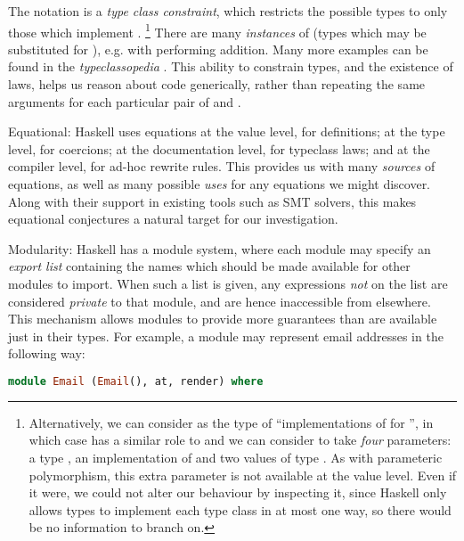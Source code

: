 \begin{description}
The notation  is a \emph{type class constraint}, which restricts the possible types  to only those which implement . \footnote{Alternatively, we can consider  as the type of ``implementations of  for '', in which case \hs{=>} has a similar role to \hs{->} and we can consider  to take \emph{four} parameters: a type , an implementation of  and two values of type . As with parameteric polymorphism, this extra  parameter is not available at the value level. Even if it were, we could not alter our behaviour by inspecting it, since Haskell only allows types to implement each type class in at most one way, so there would be no information to branch on.} There are many \emph{instances} of  (types which may be substituted for ), e.g.  with  performing addition. Many more examples can be found in the \emph{typeclassopedia} \citep{yorgey2009typeclassopedia}. This ability to constrain types, and the existence of laws, helps us reason about code generically, rather than repeating the same arguments for each particular pair of  and .

\item{Equational}: Haskell uses equations at the value level, for definitions; at the type level, for coercions; at the documentation level, for typeclass laws; and at the compiler level, for ad-hoc rewrite rules. This provides us with many \emph{sources} of equations, as well as many possible \emph{uses} for any equations we might discover. Along with their support in existing tools such as SMT solvers, this makes equational conjectures a natural target for our investigation.

\item{Modularity}: Haskell has a module system, where each module may specify an \emph{export list} containing the names which should be made available for other modules to import. When such a list is given, any expressions \emph{not} on the list are considered \emph{private} to that module, and are hence inaccessible from elsewhere. This mechanism allows modules to provide more guarantees than are available just in their types. For example, a module may represent email addresses in the following way:

\begin{lstlisting}[language=Haskell, xleftmargin=.2\textwidth, xrightmargin=.2\textwidth, upquote=true]
module Email (Email(), at, render) where


\end{lstlisting}
\end{description}
